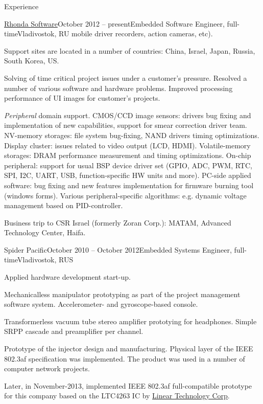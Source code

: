 \documentclass{template}
\begin{document}
\begin{rSection}{Experience}
\begin{rCompany}{\href{http://www.rhondasoftware.com}{Rhonda Software}}{October 2012 -- present}{Embedded Software Engineer, full-time}{Vladivostok, RU}
      mobile driver recorders, action cameras, etc).
\item Support sites are located in a number of countries: China, Israel, Japan, Russia, South Korea, US.
\item Solving of time critical project issues under a customer's pressure. Resolved a number of various  software and hardware
      problems. Improved processing performance of UI images for customer's projects.
\item \textit{Peripheral} domain support. CMOS/CCD image sensors: drivers bug fixing and implementation of new capabilities, support for smear
      correction driver team. NV-memory storages: file system bug-fixing, NAND drivers timing optimizations. Display cluster: issues related to
      video output (LCD, HDMI). Volatile-memory storages: DRAM performance measurement and timing optimizations. On-chip peripheral: support for
      usual BSP device driver set (GPIO, ADC, PWM, RTC, SPI, I2C, UART, USB, function-specific HW units and more). PC-side applied software: bug
      fixing and new features implementation for firmware burning tool (windows forms). Various peripheral-specific algorithms: e.g. dynamic
      voltage management based on PID-controller.
\item Business trip to CSR Israel (formerly Zoran Corp.): MATAM, Advanced Technology Center, Haifa. \newline

\end{rCompany}
\begin{rCompany}{Spider Pacific}{October 2010 -- October 2012}{Embedded Systems Engineer, full-time}{Vladivostok, RUS}

\item Applied hardware development start-up.
\item Mechanicalless manipulator prototyping as part of the project management software system. \newline Accelerometer- and gyroscope-based console.
\item Transformerless vacuum tube stereo amplifier prototying for headphones. \newline Simple SRPP cascade and preamplifier per channel.
\item Prototype of the  injector design and manufacturing. Physical layer of the IEEE
      802.3af specification was implemented. The product was used in a number of computer network projects.
\item Later, in November-2013, implemented IEEE 802.3af full-compatible prototype for this company based on the LTC4263 IC by
      \href{http://www.linear.com}{Linear Technology Corp}.

\end{rCompany}
\end{rSection}
\end{document}
